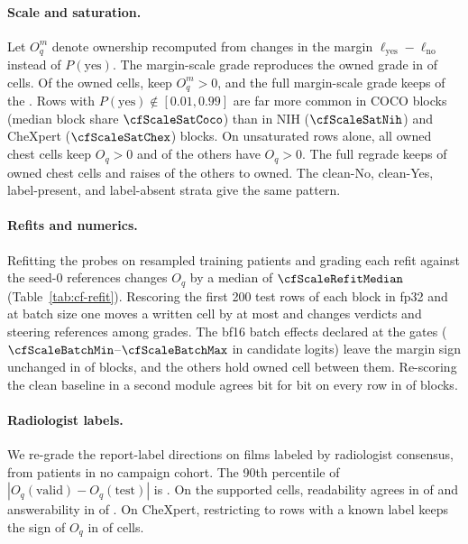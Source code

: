 

\paragraph{Scale and saturation.} Let $O^m_q$ denote ownership recomputed from changes in the margin $\ell_{\mathrm{yes}}-\ell_{\mathrm{no}}$ instead of $P(\mathrm{yes})$. The margin-scale grade reproduces the owned grade in \cfScaleAgree{} of \cfScaleAgreeN{} cells. Of the \cfScaleOwned{} owned cells, \cfScaleOwnedMpos{} keep $O^m_q>0$, and the full margin-scale grade keeps \cfScaleOwnedKeepFull{} of the \cfScaleOwned{}. Rows with $P(\mathrm{yes})\notin[0.01,0.99]$ are far more common in COCO blocks (median block share $\cfScaleSatCoco$) than in NIH ($\cfScaleSatNih$) and CheXpert ($\cfScaleSatChex$) blocks. On unsaturated rows alone, all \cfScaleUnsatOwned{} owned chest cells keep $O_q>0$ and \cfScaleUnsatOtherPos{} of the \cfScaleUnsatOther{} others have $O_q>0$. The full regrade keeps \cfScaleUnsatGradeKept{} of \cfScaleUnsatGradeN{} owned chest cells and raises \cfScaleUnsatGradeGained{} of the \cfScaleUnsatGradeOtherN{} others to owned. The clean-No, clean-Yes, label-present, and label-absent strata give the same pattern.

\paragraph{Refits and numerics.} Refitting the probes on resampled training patients and grading each refit against the seed-0 references changes $O_q$ by a median of $\cfScaleRefitMedian$ (Table~\ref{tab:cf-refit}). Rescoring the first 200 test rows of each block in fp32 and at batch size one moves a written cell by at most \cfPrecisionMaxDW{} and changes \cfPrecisionVerdictChanges{} verdicts and \cfPrecisionRefChanges{} steering references among \cfPrecisionGradeCells{} grades. The bf16 batch effects declared at the gates ($\cfScaleBatchMin$--$\cfScaleBatchMax$ in candidate logits) leave the margin sign unchanged in \cfScaleBatchAgree{} of \cfScaleBatchN{} blocks, and the \cfScaleBatchDisagree{} others hold \cfScaleBatchDisagreeOwned{} owned cell between them. Re-scoring the clean baseline in a second module agrees bit for bit on every row in \cfScaleBaselineIdentical{} of \cfScaleBaselineN{} blocks.



\paragraph{Radiologist labels.} We re-grade the report-label directions on \cfValidRows{} films labeled by radiologist consensus, from patients in no campaign cohort. The 90th percentile of $|O_q(\text{valid})-O_q(\text{test})|$ is \cfValidNinetyDO{}. On the \cfValidSupported{} supported cells, readability agrees in \cfValidReadableAgree{} of \cfValidReadableN{} and answerability in \cfValidAnswerAgree{} of \cfValidAnswerN{}. On CheXpert, restricting to rows with a known label keeps the sign of $O_q$ in \cfValKnownSignAgree{} of \cfValKnownN{} cells.

